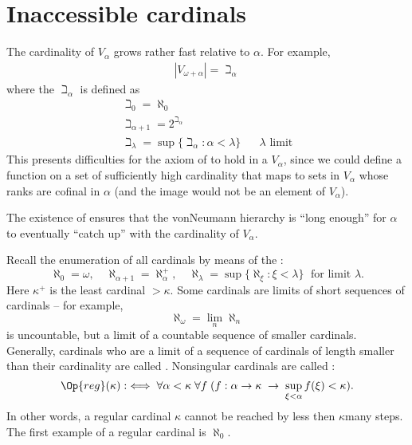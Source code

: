 \documentclass[letterpaper,10pt,english]{jupyterBook}
\begin{document}
\section{Inaccessible cardinals}
\label{\detokenize{large_cardinals:inaccessible-cardinals}}
\sphinxAtStartPar
The cardinality of \(V_\alpha\) grows rather fast relative to \(\alpha\). For example,
\begin{equation*}
\begin{split}
    |V_{\omega+\alpha}| = \beth_\alpha
\end{split}
\end{equation*}
\sphinxAtStartPar
where the  \(\beth_\alpha\) is defined as
\begin{gather*}
    \beth_0 = \aleph_0 \\
    \beth_{\alpha+1} = 2^{\beth_\alpha} \\
    \beth_{\lambda} = \sup \{ \beth_\alpha \colon \alpha < \lambda\} \quad \text{ $\lambda$ limit}
\end{gather*}
\sphinxAtStartPar
This presents difficulties for the axiom of  to hold in a \(V_\alpha\), since we could define a function on a set of sufficiently high cardinality that maps to sets in \(V_\alpha\) whose ranks are cofinal in \(\alpha\) (and the image would not be an element of \(V_\alpha\)).

\sphinxAtStartPar
The existence of  ensures that the von\sphinxhyphen{}Neumann hierarchy is “long enough” for \(\alpha\) to eventually “catch up” with the cardinality of \(V_\alpha\).

\sphinxAtStartPar
Recall the enumeration of all cardinals by means of the :
\begin{equation*}
\aleph_0 = \omega, \quad \aleph_{\alpha+1} = \aleph_\alpha^+, \quad  \aleph_\lambda = \sup \{ \aleph_\xi \colon \xi<\lambda\} \; \text{ for limit } \lambda.
\end{equation*}
\sphinxAtStartPar
Here \(\kappa^+\) is the least cardinal \(> \kappa\). Some cardinals are limits of short sequences of cardinals – for example,
\begin{equation*}
    \aleph_\omega = \lim_n \aleph_n
\end{equation*}
\sphinxAtStartPar
is uncountable, but a limit of a countable sequence of smaller cardinals. Generally, cardinals who are a limit of a sequence of cardinals of length smaller than their cardinality are called . Non\sphinxhyphen{}singular cardinals are called :
\begin{equation*}
\Op{reg}(\kappa): \iff \forall \alpha < \kappa \;  \forall f \;( f: \alpha \to \kappa \;  \to \; \sup_{\xi < \alpha} f(\xi) < \kappa).
\end{equation*}
\sphinxAtStartPar
In other words, a regular cardinal \(\kappa\) cannot be reached  by less then \(\kappa\)\sphinxhyphen{}many steps.  The first example of a regular cardinal is \(\aleph_0\).
\end{document}
